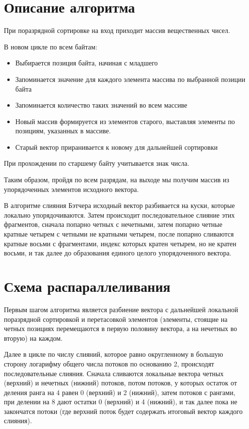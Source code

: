 \documentclass{report}
\begin{document}
\section*{Описание алгоритма}
При поразрядной сортировке на вход приходит массив вещественных чисел.
\par В новом цикле по всем байтам:
\begin{itemize}
\item Выбирается позиция байта, начиная с младшего
\item Запоминается значение для каждого элемента массива по выбранной позиции байта
\item Запоминается количество таких значений во всем массиве
\item Новый массив формируется из элементов старого, выставляя элементы по позициям, указанных в массиве.
\item Старый вектор приранивается к новому для дальнейшей сортировки
\end{itemize}
\par При прохождении по старшему байту учитывается знак числа.
\par Таким образом, пройдя по всем разрядам, на выходе мы получим массив из упорядоченных элементов исходного вектора.
\par В алгоритме слияния Бэтчера исходный вектор разбивается на куски, которые локально упорядочиваются. Затем происходит последовательное слияние этих фрагментов, сначала попарно четных с нечетными, затем попарно четные кратные четырем с четными не кратными четырем, после попарно сливаются кратные восьми с фрагментами, индекс которых кратен четырем, но не кратен восьми, и так далее до образования единого целого упорядоченного вектора.
\newpage

\section*{Схема распараллеливания}
Первым шагом алгоритма является разбиение вектора с дальнейшей локальной поразрядной сортировкой и перетасовкой элементов (элементы, стоящие на четных позициях перемещаются в первую половину вектора, а на нечетных во вторую) на каждом.
\par Далее в цикле по числу слияний, которое равно округленному в большую сторону логарифму общего числа потоков по основанию 2, происходят последовательные слияния. Сначала сливаются локальные вектора четных (верхний) и нечетных (нижний) потоков, потом потоков, у которых остаток от деления ранга на 4 равен 0 (верхний) и 2 (нижний), затем потоков с рангами, при делении на 8 дают остатки 0 (верхний) и 4 (нижний), и так далее пока не закончатся потоки (где верхний поток будет содержать итоговый вектор каждого слияния).
\newpage
\end{document}
